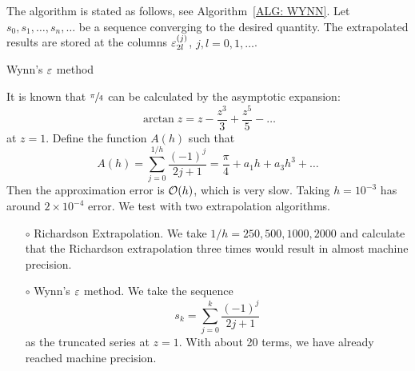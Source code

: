 The algorithm is stated as follows, see Algorithm~\ref{ALG: WYNN}. Let $s_0, s_1, \dots, s_n,\dots$ be a sequence converging to the desired quantity. The extrapolated results are stored at the columns $\varepsilon_{2l}^{(j)}$, $j, l=0,1, \dots$.
\begin{algorithm}[!htb]
    \SetAlgoLined
    \caption{Wynn's $\varepsilon$ method}
    \label{ALG: WYNN}
\end{algorithm}

\begin{example}
    It is known that $\sfrac{\pi}{4}$ can be calculated by the asymptotic expansion:
    \begin{equation}
        \arctan z = z - \frac{z^3}{3} + \frac{z^5}{5} - \dots 
    \end{equation}
    at $z = 1$. Define the function $A(h)$ such that 
    \begin{equation}
        A(h)= \sum_{j=0}^{1/h} \frac{(-1)^j}{2 j + 1} = \frac{\pi}{4} + a_1 h + a_3 h^3 + \dots
    \end{equation}
    Then the approximation error is $\mathcal O(h)$, which is very slow. Taking $h=10^{-3}$ has around $2\times 10^{-4}$ error.  We test with two extrapolation algorithms.
    \begin{enumerate}
        \item [$\circ$] Richardson Extrapolation. We take $1/h = 250, 500, 1000, 2000$ and calculate that the Richardson extrapolation three times would result in almost machine precision.
        \item [$\circ$] Wynn's $\varepsilon$ method. We take the sequence 
        $$s_k = \sum_{j=0}^k \frac{(-1)^j}{2 j + 1}$$
        as the truncated series at $z = 1$. With about 20 terms, we have already reached machine precision.
    \end{enumerate}
\end{example}
